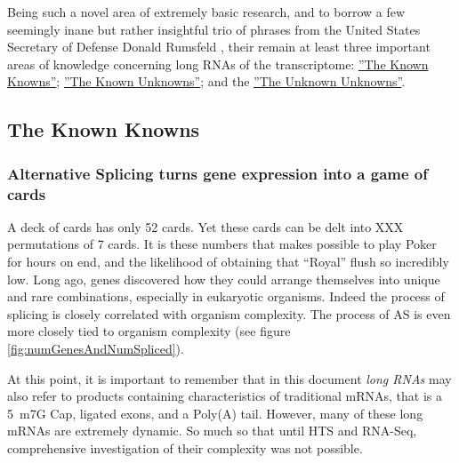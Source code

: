     Being such a novel area of extremely basic research, and to borrow a few seemingly inane but rather insightful trio of phrases from the United States Secretary of Defense Donald Rumsfeld \citep{Rumsfeld2011}, their remain at least three important areas of knowledge concerning long RNAs of the transcriptome: 
    \hyperref[subsec: The Known Knowns]{''The Known Knowns''}; 
    \hyperref[subsec: The Known Unknowns]{''The Known Unknowns''}; 
    and the \hyperref[subsec: The Unknown Unknowns]{''The Unknown Unknowns''}.

  \subsection{The Known Knowns}\label{subsec: The Known Knowns}

    \subsubsection{Alternative Splicing turns gene expression into a game of cards}

      A deck of cards has only 52 cards. Yet these cards can be delt into XXX permutations of 7 cards. It is these numbers that makes possible to play Poker for hours on end, and the likelihood of obtaining that ``Royal'' flush so incredibly low. Long ago, genes discovered how they could arrange themselves into unique and rare combinations, especially in eukaryotic organisms. Indeed the process of splicing is closely correlated with organism complexity. The process of AS is even more closely tied to organism complexity (see figure \ref{fig:numGenesAndNumSpliced}). 


      At this point, it is important to remember that in this document \textit{long RNAs} may also refer to products containing characteristics of traditional mRNAs, that is a 5\textprime~m7G Cap, ligated exons, and a Poly(A) tail. However, many of these long mRNAs are extremely dynamic. So much so that until HTS and RNA-Seq, comprehensive investigation of their complexity was not possible.

